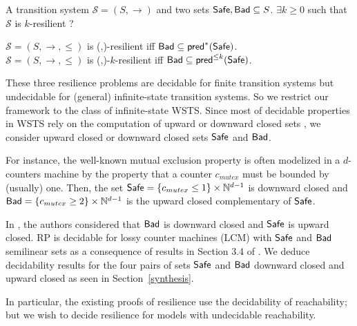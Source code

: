 {A transition system $\mathscr{S}=(S,\rightarrow)$ and two sets $\textsf{Safe}, \textsf{Bad} \subseteq S$.}
{$\exists k \geq 0$ such that $\mathscr{S}$ is %
 $k$-resilient ?\newline}


\begin{remark}[Reformulation]\label{reformulation}
$\mathscr{S}=(S,\rightarrow,\leq)$ is %
(\Bad,\Safe)-resilient iff $\textsf{Bad} \subseteq \textsf{pred}^*(\textsf{Safe})$.\\
$\mathscr{S}=(S,\rightarrow,\leq)$ is %
(\Bad,\Safe)-$k$-resilient iff $\textsf{Bad} \subseteq \textsf{pred}^{\leq k}(\textsf{Safe})$.
\end{remark}

These three resilience problems are decidable for finite transition systems but undecidable for (general) infinite-state transition systems. So we restrict our framework to the class of infinite-state WSTS. Since most of decidable properties in WSTS rely on the computation of upward or downward closed sets \cite{DBLP:journals/iandc/AbdullaCJT00, DBLP:journals/tcs/FinkelS01}, we consider upward closed or downward closed sets $\textsf{Safe}$ and $\textsf{Bad}$.

For instance, the well-known mutual exclusion property is often modelized in a $d$-counters machine by the property that a counter $c_{mutex}$ must be bounded by (usually) one. Then, the set $\textsf{Safe} =  \{c_{mutex} \leq 1\} \times \mathbb{N}^{d-1}$ is downward closed and $\textsf{Bad} =\{c_{mutex} \geq 2\} \times  \mathbb{N}^{d-1} $ is the upward closed complementary of $\textsf{Safe}$. 

In \cite{DBLP:conf/gg/Ozkan22}, the authors considered that $\textsf{Bad}$ is downward closed and $\textsf{Safe}$ is upward closed.
%		
RP is decidable for lossy counter machines (LCM) with $\textsf{Safe}$ and $\textsf{Bad}$ semilinear sets as a consequence of results in Section 3.4 of \cite{DBLP:conf/rp/Schnoebelen10}. We deduce 
decidability results for the four pairs of sets $\textsf{Safe}$ and $\textsf{Bad}$ downward closed and upward closed as seen in Section~\ref{synthesis}.

In particular, the existing proofs of resilience use the decidability of reachability; but we wish to decide resilience for models with undecidable reachability.
%

